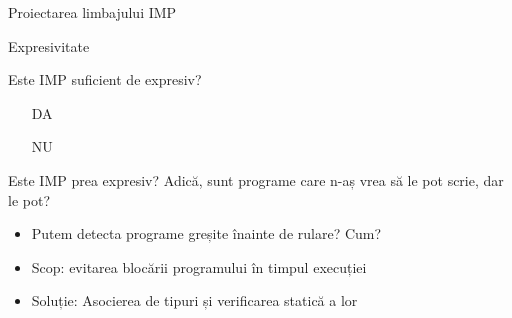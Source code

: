 \documentclass[xcolor=pdftex,romanian,colorlinks]{beamer}
\begin{document}
\begin{section}{Proiectarea limbajului IMP}
\begin{frame}{Expresivitate}
\begin{block}{Este IMP suficient de expresiv?}
\begin{itemize}
\item[DA] 

\item[NU] 
\end{itemize}
\end{block}
\begin{block}{Este IMP prea expresiv?}
 Adică, sunt programe care n-aș vrea să le pot scrie, dar le pot?
\begin{itemize}
\item Putem detecta programe greșite înainte de rulare? Cum?
\item Scop: evitarea blocării programului în timpul execuției
\item Soluție: Asocierea de tipuri și verificarea statică a lor
\end{itemize}
\end{block}
\end{frame}

\end{section}
\end{document}
